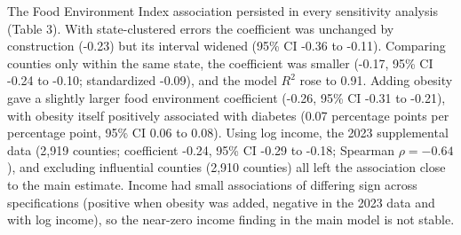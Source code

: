 \documentclass[12pt]{article}
\begin{document}
The Food Environment Index association persisted in every sensitivity analysis (Table 3). With state-clustered errors the coefficient was unchanged by construction (-0.23) but its interval widened (95\% CI -0.36 to -0.11). Comparing counties only within the same state, the coefficient was smaller (-0.17, 95\% CI -0.24 to -0.10; standardized -0.09), and the model $R^2$ rose to 0.91. Adding obesity gave a slightly larger food environment coefficient (-0.26, 95\% CI -0.31 to -0.21), with obesity itself positively associated with diabetes (0.07 percentage points per percentage point, 95\% CI 0.06 to 0.08). Using log income, the 2023 supplemental data (2,919 counties; coefficient -0.24, 95\% CI -0.29 to -0.18; Spearman $\rho = -0.64$), and excluding influential counties (2,910 counties) all left the association close to the main estimate. Income had small associations of differing sign across specifications (positive when obesity was added, negative in the 2023 data and with log income), so the near-zero income finding in the main model is not stable.

\begin{table}[H]
\centering\small
\caption{Characteristics of the 3,100 counties in the main analysis. SD = standard deviation; IQR shown as 25th to 75th percentile; pp = percentage points. Source: County Health Rankings \& Roadmaps 2025 Annual Data Release; author analysis.}
\end{table}
\end{document}
